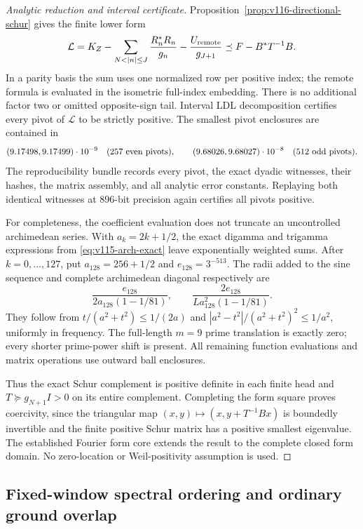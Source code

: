 \documentclass[11pt]{article}
\theoremstyle{remark}
\begin{document}
\begin{proof}[Analytic reduction and interval certificate]
Proposition~\ref{prop:v116-directional-schur} gives the finite lower form
\begin{equation}\label{eq:v116-certified-lower}
 \mathcal L=K_Z-
 \sum_{N<|n|\le J}\frac{R_n^*R_n}{g_n}
 -\frac{U_{\rm remote}}{g_{J+1}}
 \preceq F-B^*T^{-1}B.
\end{equation}
In a parity basis the sum uses one normalized row per positive index;
the remote formula is evaluated in the isometric full-index embedding.
There is no additional factor two or omitted opposite-sign tail.
Interval LDL decomposition certifies every pivot of $\mathcal L$ to
be strictly positive. The smallest pivot enclosures are contained in
\[
 (9.17498,9.17499)\cdot10^{-9}\quad\hbox{(257 even pivots)},
 \qquad
 (9.68026,9.68027)\cdot10^{-8}\quad\hbox{(512 odd pivots)}.
\]
The reproducibility bundle records every pivot, the exact dyadic
witnesses, their hashes, the matrix assembly, and all analytic error
constants. Replaying both identical witnesses at 896-bit precision
again certifies all pivots positive.

For completeness, the coefficient evaluation does not truncate an
uncontrolled archimedean series. With $a_k=2k+1/2$, the exact
digamma and trigamma expressions from
\eqref{eq:v115-arch-exact} leave exponentially weighted sums.
After $k=0,\ldots,127$, put $a_{128}=256+1/2$ and
$e_{128}=3^{-513}$. The radii added to the sine sequence and
complete archimedean diagonal respectively are
\[
 \frac{e_{128}}{2a_{128}(1-1/81)},\qquad
 \frac{2e_{128}}{La_{128}^2(1-1/81)}.
\]
They follow from $t/(a^2+t^2)\le1/(2a)$ and
$|a^2-t^2|/(a^2+t^2)^2\le1/a^2$, uniformly in frequency.
The full-length $m=9$ prime translation is exactly zero; every
shorter prime-power shift is present. All remaining function evaluations
and matrix operations use outward ball enclosures.

Thus the exact Schur complement is positive definite in each finite
head and $T\succeq g_{N+1}I>0$ on its entire complement. Completing
the form square proves coercivity, since the triangular map
$(x,y)\mapsto(x,y+T^{-1}Bx)$ is boundedly invertible and the finite
positive Schur matrix has a positive smallest eigenvalue. The established
Fourier form core extends the result to the complete closed form domain.
No zero-location or Weil-positivity assumption is used.
\end{proof}

\subsection{Fixed-window spectral ordering and ordinary ground overlap}
\end{document}

